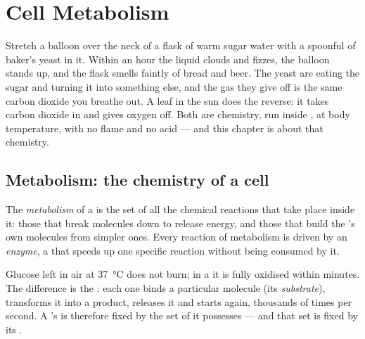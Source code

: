 \chapter{Cell Metabolism}\label{ch:g10:cell-metabolism}

Stretch a balloon over the neck of a flask of warm sugar water with a
spoonful of baker's yeast in it. Within an hour the liquid clouds and
fizzes, the balloon stands up, and the flask smells faintly of bread and
beer. The yeast  are eating the sugar and turning it into
something else, and the gas they give off is the same carbon dioxide you
breathe out. A leaf in the sun does the reverse: it takes carbon dioxide
in and gives oxygen off. Both are chemistry, run inside , at body
temperature, with no flame and no acid --- and this chapter is about
that chemistry.

\section{Metabolism: the chemistry of a cell}

\begin{definition}[Metabolism]\label{def:g10:cell-metabolism:metabolism}
The \emph{metabolism} of a  is the set of all the
chemical reactions that take place inside it: those that break
molecules down to release energy, and those that build the 's own
molecules from simpler ones. Every reaction of metabolism is driven by
an \emph{enzyme}, a  that speeds up one specific
reaction without being consumed by it.
\end{definition}

\begin{proposition}\label{prop:g10:cell-metabolism:enzymes}
Glucose left in air at \qty{37}{\celsius} does not burn; in a  it
is fully oxidised within minutes. The difference is the : each
one binds a particular molecule (its \emph{substrate}), transforms it
into a product, releases it and starts again, thousands of times per
second. A 's  is therefore fixed by the set of  it
possesses --- and that set is fixed by its .
\end{proposition}
\admitted

